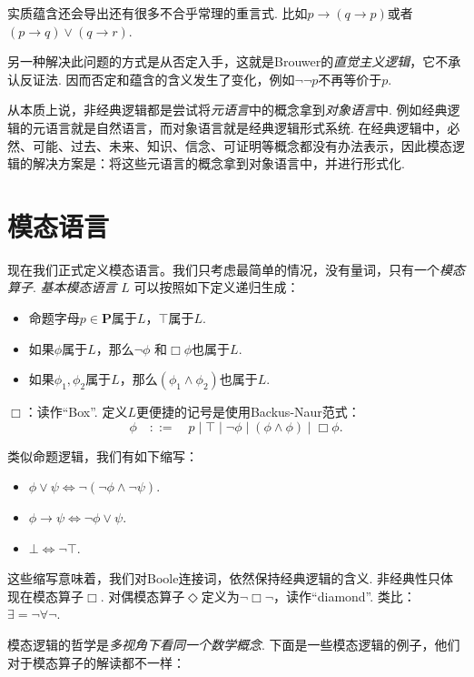 实质蕴含还会导出还有很多不合乎常理的重言式. 比如$p\to(q\to p)$或者$(p\to q)\vee (q\to r)$.

另一种解决此问题的方式是从否定入手，这就是Brouwer的\emph{直觉主义逻辑}，它不承认反证法. 因而否定和蕴含的含义发生了变化，例如$\neg\neg p$不再等价于$p$. 
    
从本质上说，非经典逻辑都是尝试将\emph{元语言}中的概念拿到\emph{对象语言}中. 例如经典逻辑的元语言就是自然语言，而对象语言就是经典逻辑形式系统. 在经典逻辑中，必然、可能、过去、未来、知识、信念、可证明等概念都没有办法表示，因此模态逻辑的解决方案是：将这些元语言的概念拿到对象语言中，并进行形式化. 
    
\section{模态语言}
现在我们正式定义模态语言。我们只考虑最简单的情况，没有量词，只有一个\emph{模态算子}. \emph{基本模态语言} $L$ 可以按照如下定义递归生成：
\begin{itemize}
    \item 命题字母$p\in \mathbf P$属于$L$，$\top$属于$L$.
    \item 如果$\phi$属于$L$，那么$\neg\phi$ 和$\Box\phi$也属于$L$.
    \item 如果$\phi_1,\phi_2$属于$L$，那么$(\phi_1\wedge\phi_2)$也属于$L$.
\end{itemize}
$\Box$：读作“Box”. 定义$L$更便捷的记号是使用Backus-Naur范式：
    \[\phi\quad::=\quad p\mid \top\mid \neg\phi\mid (\phi\wedge\phi)\mid \Box\phi.\] 

类似命题逻辑，我们有如下缩写：
\begin{itemize}
    \item $\phi\vee\psi\iff\neg(\neg \phi\wedge\neg\psi)$.
    \item $\phi\to\psi\iff\neg\phi\vee\psi$.
    \item $\bot\iff\neg\top$.
\end{itemize}
这些缩写意味着，我们对Boole连接词，依然保持经典逻辑的含义. 非经典性只体现在模态算子$\Box$. 对偶模态算子$\Diamond$定义为$\neg\Box\neg$，读作“diamond”. 类比：$\exists=\neg\forall\neg$.

模态逻辑的哲学是\emph{多视角下看同一个数学概念}. 下面是一些模态逻辑的例子，他们对于模态算子的解读都不一样：

